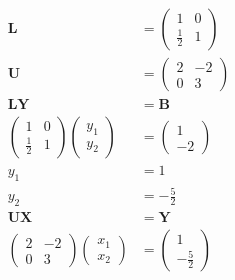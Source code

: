 \documentclass{article}
\begin{document}
\begin{align*}
  \mathbf{L}                            & = \begin{pmatrix}
                                              1           & 0 \\
                                              \frac{1}{2} & 1
                                            \end{pmatrix} \\
  \mathbf{U}                            & = \begin{pmatrix}
                                              2 & -2 \\
                                              0 & 3
                                            \end{pmatrix}  \\
  \mathbf{L Y}                          & = \mathbf{B}      \\
  \begin{pmatrix}
    1           & 0 \\
    \frac{1}{2} & 1
  \end{pmatrix} \begin{pmatrix}
                  y_1 \\
                  y_2
                \end{pmatrix}         & = \begin{pmatrix}
                                            1 \\
                                            -2
                                          \end{pmatrix}    \\
  y_1                                   & = 1               \\
  y_2                                   & = -\frac{5}{2}    \\
  \mathbf{U X}                          & = \mathbf{Y}      \\
  \begin{pmatrix}
    2 & -2 \\
    0 & 3
  \end{pmatrix} \begin{pmatrix}
                  x_1 \\
                  x_2
                \end{pmatrix}         & = \begin{pmatrix}
                                            1 \\
                                            -\frac{5}{2}

\end{pmatrix}
\end{align*}
\end{document}
